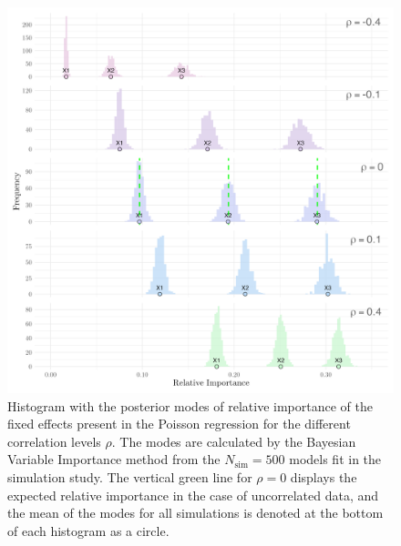 \begin{figure}[H]
  \centering
  \includegraphics[width=1\linewidth]{Figures/Simulation study/Fixed_combined_poisson.png}
  \caption[Relative importance of the fixed effects in Poisson GLMM]{Histogram with the posterior modes of relative importance of the fixed effects present in the Poisson regression for the different correlation levels $\rho$. The modes are calculated by the Bayesian Variable Importance method from the $N_{\text{sim}}=500$ models fit in the simulation study. The vertical green line for $\rho=0$ displays the expected relative importance in the case of uncorrelated data, and the mean of the modes for all simulations is denoted at the bottom of each histogram as a circle.}
  \label{fig:fixed_combined_poisson}
\end{figure}
